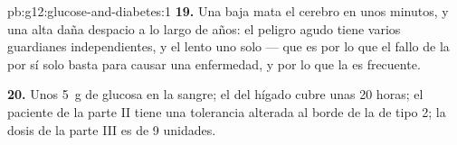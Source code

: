 \begin{solution}{pb:g12:glucose-and-diabetes:1}
\textbf{19.} Una  baja mata el cerebro en unos minutos, y una
alta daña despacio a lo largo de años: el peligro agudo tiene varios
guardianes independientes, y el lento uno solo --- que es por lo que el
fallo de la  por sí solo basta para causar una enfermedad, y
por lo que la  es frecuente.

\textbf{20.} Unos \qty{5}{g} de glucosa en la sangre; el  del
hígado cubre unas 20 horas; el paciente de la parte II tiene una
tolerancia alterada al borde de la  de tipo 2; la dosis de la
parte III es de 9 unidades.
\end{solution}
